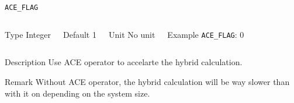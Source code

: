 \documentclass[xcolor=dvipsnames,t]{beamer}
\begin{document}
\begin{frame}[allowframebreaks]{\texttt{ACE\_FLAG}} \label{ACE_FLAG}
\vspace*{-12pt}
\begin{columns}
\begin{block}{Type}
Integer
\end{block}

\begin{block}{Default}
1
\end{block}

\begin{block}{Unit}
No unit
\end{block}

\begin{block}{Example}
\texttt{ACE\_FLAG}: 0
\end{block}
\end{columns}

\begin{block}{Description}
Use ACE operator to accelarte the hybrid calculation.
\end{block}

\begin{block}{Remark}
Without ACE operator, the hybrid calculation will be way slower than with it on depending on the system size.
\end{block}

\end{frame}
\end{document}

